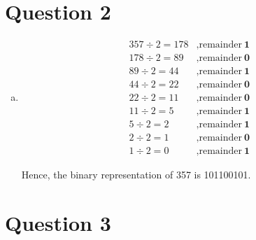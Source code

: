 \documentclass[12pt]{article}
\begin{document}
\section*{Question 2}
\begin{enumerate}[a.]
    \item

    \begin{align*}
        357 \div 2 = 178 &, \text{remainder}\:\textbf{1}\\
        178 \div 2 = 89 &, \text{remainder}\:\textbf{0}\\
        89 \div 2 = 44 &, \text{remainder}\:\textbf{1}\\
        44 \div 2 = 22 &, \text{remainder}\:\textbf{0}\\
        22 \div 2 = 11 &, \text{remainder}\:\textbf{0}\\
        11 \div 2 = 5 &, \text{remainder}\:\textbf{1}\\
        5 \div 2 = 2 &, \text{remainder}\:\textbf{1}\\
        2 \div 2 = 1 &, \text{remainder}\:\textbf{0}\\
        1 \div 2 = 0 &, \text{remainder}\:\textbf{1}
    \end{align*}

    Hence, the binary representation of 357 is 101100101.
\end{enumerate}

\section*{Question 3}
\end{document}
